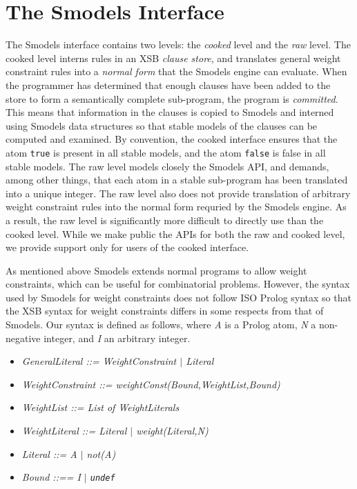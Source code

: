 \section{The Smodels Interface}
%
The Smodels interface contains two levels: the \emph{cooked} level and
the \emph{raw} level.  The cooked level interns rules in an XSB
\emph{clause store}, and translates general weight constraint rules
\cite{SiNS02} into a \emph{normal form} that the Smodels engine can
evaluate.  When the programmer has determined that enough clauses have
been added to the store to form a semantically complete sub-program,
the program is \emph{committed}.  This means that information in the
clauses is copied to Smodels and interned using Smodels data
structures so that stable models of the clauses can be computed and
examined.  By convention, the cooked interface ensures that the atom
{\tt true} is present in all stable models, and the atom {\tt false}
is false in all stable models.  The raw level models closely the
Smodels API, and demands, among other things, that each atom in a
stable sub-program has been translated into a unique integer.  The raw
level also does not provide translation of arbitrary weight constraint
rules into the normal form requried by the Smodels engine.  As a
result, the raw level is significantly more difficult to directly use
than the cooked level.  While we make public the APIs for both the raw
and cooked level, we provide support only for users of the cooked
interface.

As mentioned above Smodels extends normal programs to allow weight
constraints, which can be useful for combinatorial problems.  However,
the syntax used by Smodels for weight constraints does not follow ISO
Prolog syntax so that the XSB syntax for weight constraints differs in
some respects from that of Smodels.  Our syntax is defined as follows,
where \emph{A} is a Prolog atom, \emph{N} a non-negative integer, and
\emph{I} an arbitrary integer.

\begin{itemize}

\item {\em GeneralLiteral ::= WeightConstraint $|$ Literal }

\item {\em WeightConstraint ::= weightConst(Bound,WeightList,Bound) }

\item {\em WeightList ::= List of WeightLiterals }

\item {\em WeightLiteral ::= Literal $|$ weight(Literal,N) }

\item {\em Literal ::= A $|$ not(A) }

\item {\em Bound ::== I $|$ {\tt undef} }

\end{itemize}

